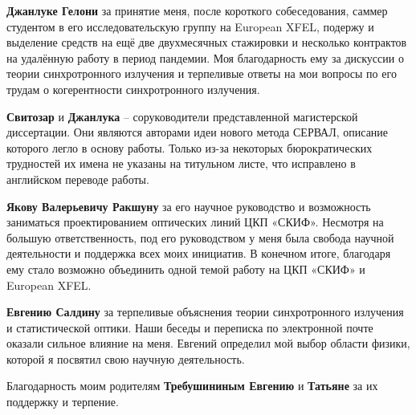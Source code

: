 \textbf{Джанлуке Гелони} за принятие меня, после короткого собеседования, саммер студентом в его исследовательскую группу на European XFEL, подержу и выделение средств на ещё две двухмесячных стажировки и несколько контрактов на удалённую работу в период пандемии. Моя благодарность ему за дискуссии о теории синхротронного излучения и терпеливые ответы на мои вопросы по его трудам о когерентности синхротронного излучения.

\textbf{Свитозар} и \textbf{Джанлука} -- соруководители представленной магистерской диссертации. Они являются авторами идеи нового метода СЕРВАЛ, описание которого легло в основу работы. Только из-за некоторых бюрократических трудностей их имена не указаны на титульном листе, что исправлено в английском переводе работы. 

\textbf{Якову Валерьевичу Ракшуну} за его научное руководство и возможность заниматься проектированием оптических линий ЦКП «СКИФ». Несмотря на большую ответственность, под его руководством у меня была свобода научной деятельности и поддержка всех моих инициатив. В конечном итоге, благодаря ему стало возможно объединить одной темой работу на ЦКП «СКИФ» и European XFEL. 

\textbf{Евгению Салдину} за терпеливые объяснения теории синхротронного излучения и статистической оптики. Наши беседы и переписка по электронной почте оказали сильное влияние на меня. Евгений определил мой выбор области физики, которой я посвятил свою научную деятельность. 

Благодарность моим родителям \textbf{Требушининым Евгению} и \textbf{Татьяне} за их поддержку и терпение.










